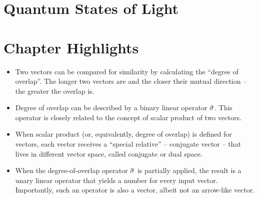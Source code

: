 \section{Quantum States of Light}

\section*{Chapter Highlights}
{\chhc
  \it
\begin{itemize}
\item Two vectors can be compared for similarity by calculating the
  ``degree of overlap''. The longer two vectors are and the closer
  their mutual direction -- the greater the overlap is.
\item Degree of overlap can be described by a binary linear operator
  $\op{\sigma}$. This operator is closely related to the concept of
  scalar product of two vectors.
\item When scalar product (or, equivalently, degree of overlap) is
  defined for vectors, each vector receives a ``special relative'' --
  conjugate vector -- that lives in different vector space, called
  conjugate or dual space.
\item When the degree-of-overlap operator $\op{\sigma}$ is partially
  applied, the result is a unary linear operator that yields a number
  for every input vector. Importantly, such an operator is also a
  vector, albeit not an arrow-like vector.
\end{itemize}

}

